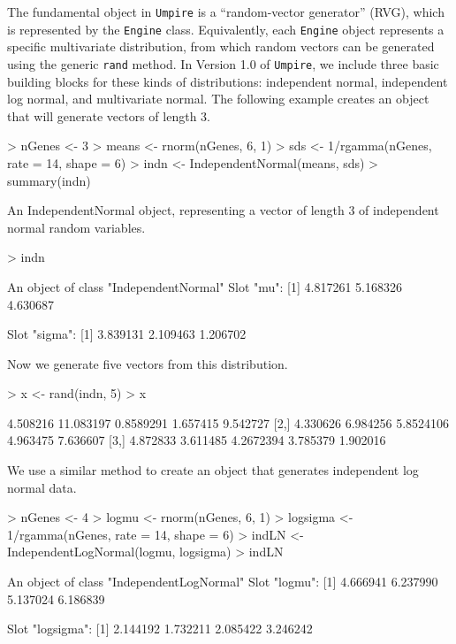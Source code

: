 \documentclass[11pt]{article}
\def\rcode#1{\texttt{#1}}
\def\rpkg#1{\texttt{#1}}
\begin{document}
The fundamental object in \rpkg{Umpire} is a ``random-vector
generator'' (RVG), which is represented by the \rcode{Engine} class.
Equivalently, each \rcode{Engine} object represents a specific
multivariate distribution, from which random vectors can be generated
using the generic \rcode{rand} method.  In Version 1.0 of
\rpkg{Umpire}, we include three basic building blocks for these kinds
of distributions: independent normal, independent log normal, and
multivariate normal.  The following example creates an object that
will generate vectors of length $3$.
\begin{Schunk}
\begin{Sinput}
> nGenes <- 3
> means <- rnorm(nGenes, 6, 1)
> sds <- 1/rgamma(nGenes, rate = 14, shape = 6)
> indn <- IndependentNormal(means, sds)
> summary(indn)
\end{Sinput}
\begin{Soutput}
An IndependentNormal object, representing a vector
of length 3 of independent normal random variables.
\end{Soutput}
\begin{Sinput}
> indn
\end{Sinput}
\begin{Soutput}
An object of class "IndependentNormal"
Slot "mu":
[1] 4.817261 5.168326 4.630687

Slot "sigma":
[1] 3.839131 2.109463 1.206702
\end{Soutput}
\end{Schunk}
Now we generate five vectors from this distribution.
\begin{Schunk}
\begin{Sinput}
> x <- rand(indn, 5)
> x
\end{Sinput}
\begin{Soutput}
         [,1]      [,2]      [,3]     [,4]     [,5]
[1,] 4.508216 11.083197 0.8589291 1.657415 9.542727
[2,] 4.330626  6.984256 5.8524106 4.963475 7.636607
[3,] 4.872833  3.611485 4.2672394 3.785379 1.902016
\end{Soutput}
\end{Schunk}

We use a similar method to create an object that generates independent
log normal data.
\begin{Schunk}
\begin{Sinput}
> nGenes <- 4
> logmu <- rnorm(nGenes, 6, 1)
> logsigma <- 1/rgamma(nGenes, rate = 14, shape = 6)
> indLN <- IndependentLogNormal(logmu, logsigma)
> indLN
\end{Sinput}
\begin{Soutput}
An object of class "IndependentLogNormal"
Slot "logmu":
[1] 4.666941 6.237990 5.137024 6.186839

Slot "logsigma":
[1] 2.144192 1.732211 2.085422 3.246242
\end{Soutput}
\end{Schunk}
\end{document}
